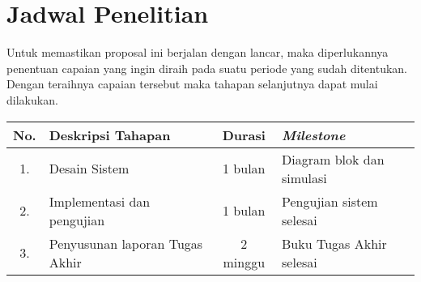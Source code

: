\section{Jadwal Penelitian}
Untuk memastikan proposal ini berjalan dengan lancar, maka diperlukannya penentuan capaian yang ingin diraih pada suatu periode yang sudah ditentukan. Dengan teraihnya capaian tersebut maka tahapan selanjutnya dapat mulai dilakukan.

\begin{center}
\begin{tabular}{|c|m{5cm}|c|m{4.5cm}|}
	\hline
	No. & Deskripsi Tahapan & Durasi & \textit{Milestone} \\
	\hline
	1. & Desain Sistem & 1 bulan &  Diagram blok dan simulasi \\
	\hline
	2. & Implementasi dan pengujian& 1 bulan & Pengujian sistem selesai \\
	\hline
	3. & Penyusunan laporan Tugas Akhir & 2 minggu & Buku Tugas Akhir selesai \\
	\hline
\end{tabular}
\end{center}
